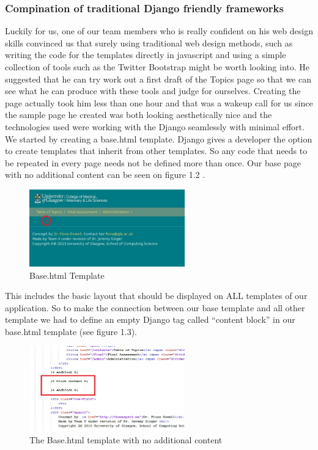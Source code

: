 \documentclass{l3proj}
\begin{document}
{\subsubsection{Compination of traditional Django friendly frameworks}
Luckily for us, one of our team members who is really confident on his web design skills
convinced us that surely using traditional web design methods, such as writing the code for the templates directly in javascript and using a simple collection of tools such as the Twitter Bootstrap might be worth looking into. He suggested that he can try work out a first draft of the Topics page so that we can see what he can produce with these tools and judge for ourselves. Creating the page actually took him less than one hour and that was a wakeup call for us since the sample page he created was both looking aesthetically nice and the technologies used were working with the Django seamlessly with minimal effort.  
We started by creating a base.html template. Django gives a developer the option to create templates that inherit from other templates. So any code that needs to be repeated in every page needs not be defined more than once. Our  base page with no additional content can be seen on figure 1.2 .
\begin{figure}[h!]
   \caption{Base.html Template}
   \centering
     \includegraphics[width=0.6\textwidth]{images/base.jpg}
\end{figure}
This includes the basic layout that should be displayed on ALL templates of our application. So to make the connection between our base template and all other template we had to define an empty Django tag  called “content block” in our base.html template (see figure 1.3). 
\begin{figure}[h!]
   \caption{The Base.html template with no additional content}
   \centering
     \includegraphics[width=0.6\textwidth]{images/baseblock.jpg}

\end{figure}}
\end{document}
